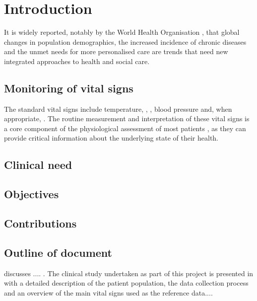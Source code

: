 \chapter{Introduction}
\label{chapter:introduction}

It is widely reported, notably by the World Health Organisation \cite{stroetmann2010can}, that global changes in population demographics, the increased incidence of chronic diseases and the unmet needs for more personalised care are trends that need new integrated approaches to health and social care. 

\lipsum[2-4]

\section{Monitoring of vital signs}

The standard vital signs include temperature, , , blood pressure and, when appropriate, . The routine measurement and interpretation of these vital signs is a core component of the physiological assessment of most patients \cite{prior1977physical,goldberg2005practical}, as they can provide critical information about the underlying state of their health. 

\lipsum[2-4]

\section{Clinical need}

\lipsum[2-4]

\section{Objectives}

\lipsum[2-4]

\section{Contributions}

\lipsum[2-4]

\section{Outline of document}

 discusses .... . The clinical study undertaken as part of this project is presented in  with a detailed description of the patient population, the data collection process and an overview of the main vital signs used as the reference data....

\lipsum[2-4]
